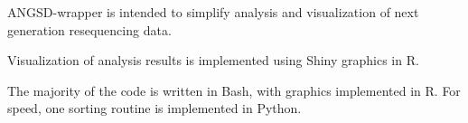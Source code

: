 

ANGSD-wrapper is intended to simplify analysis and visualization of next generation resequencing data.

Visualization of analysis results is implemented using Shiny graphics in R. 

The majority of the code is written in Bash, with graphics implemented in R. For speed, one sorting routine is implemented in Python.